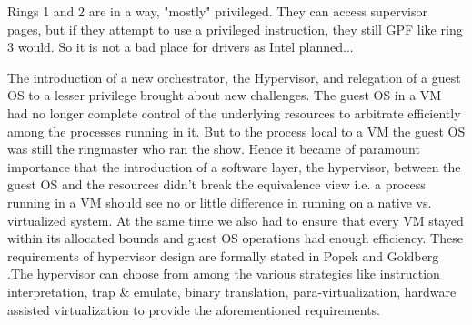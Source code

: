 Rings 1 and 2 are in a way, "mostly" privileged. They can access supervisor pages, but if they attempt to use a privileged instruction, they still GPF like ring 3 would. So it is not a bad place for drivers as Intel planned...

  
The introduction of a new orchestrator, the Hypervisor, and relegation of a guest OS to a lesser
privilege brought about new challenges. The guest OS in a VM had no longer complete control of the
underlying resources to arbitrate efficiently among the processes running in it. But to the
process local to a VM the guest OS was still the ringmaster who ran the show. Hence it became of
paramount importance that the introduction of a software layer, the hypervisor, between the guest
OS and the resources didn't break the equivalence view  i.e. a process running in a VM should see
no or little difference in running on a native vs. virtualized system. At the same time we also
had to ensure that every VM stayed within its allocated bounds and guest OS operations had enough
efficiency. These requirements of hypervisor design are formally stated in Popek and Goldberg
\citep{Popek1974}.The hypervisor can choose from among the various strategies like instruction
interpretation, trap \& emulate, binary translation, para-virtualization, hardware assisted
virtualization to provide the aforementioned requirements.\\